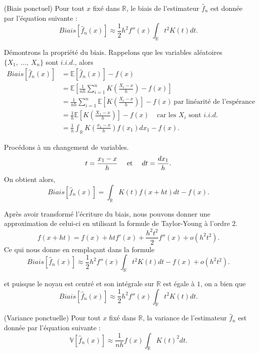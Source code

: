 \documentclass[
]{book}
\begin{document}
\begin{propri} (Biais ponctuel)
Pour tout $x$ fixé dans $\mathbb R$, le biais de l'estimateur $\hat f_n$ est donnée par l'équation suivante : 
$$Biais \left[ \hat f_n(x) \right] \approx \frac12h^2f''(x)\int_{\mathbb R} t^2K(t) dt.$$
\end{propri}

\begin{demo}
Démontrons la propriété du biais.
Rappelons que les variables aléatoires $\{ X_1,~\dots, ~X_n\}$ sont $i.i.d.$, alors
$$
\begin{aligned}
Biais  \left[ \hat f_n(x) \right] &= \mathbb E \left[ \hat f_n(x) \right] - f(x) \\
&= \mathbb E \left[ \frac1{nh} \sum\limits_{i=1}^n K\left(\frac{X_i-x}h\right) - f(x) \right] \\
&= \frac1{nh} \sum\limits_{i=1}^n \mathbb E \left[  K\left(\frac{X_i-x}h\right) \right] - f(x) ~\text{par linéarité de l'espérance} \\
&= \frac1{h} \mathbb E \left[  K\left(\frac{X_1-x}h\right) \right] - f(x) ~~~~~\text{car les } X_i \text{ sont }i.i.d.\\
&= \frac1{h} \int_{\mathbb R}  K\left(\frac{x_1-x}h\right) f(x_1)dx_1 - f(x).
\end{aligned}
$$

Procédons à un changement de variables.
$$t=\frac{x_1-x}h ~~~~\hbox{et}~~~~dt =\frac{dx_1}h.$$
On obtient alors, 
$$
Biais  \left[ \hat f_n(x) \right]
= \int_{\mathbb R}  K(t)  f(x+ht)dt - f(x).
$$

Après avoir transformé l'écriture du biais, nous pouvons donner une approximation de celui-ci en utilisant la formule de Taylor-Young à l'ordre 2.
$$f(x+ht)=f(x)+htf'(x)+\frac{h^2t^2}2 f''(x)+o(h^2t^2).$$
Ce qui nous donne en remplaçant dans la formule
$$
Biais \left[ \hat f_n(x) \right] \approx \frac12h^2f''(x)\int_{\mathbb R} t^2K(t) dt - f(x) + o(h^2t^2).
$$

et puisque le noyau est centré et son intégrale sur $\mathbb R$ est égale à $1$, on a bien que 
$$Biais \left[ \hat f_n(x) \right] \approx \frac12h^2f''(x)\int_{\mathbb R} t^2K(t) dt.$$

\end{demo}

\begin{propri} (Variance ponctuelle)
Pour tout $x$ fixé dans $\mathbb R$, la variance de l'estimateur $\hat f_n$ est donnée par l'équation suivante : 
$$\mathbb V \left[ \hat f_n(x) \right] \approx \frac1{nh} f(x) \int_{\mathbb R}K(t)^2 dt.$$
\end{propri}
\end{document}
